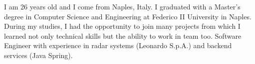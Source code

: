 

\begin{cvparagraph}

I am 26 years old and I come from Naples, Italy. I graduated with a Master's degree in Computer Science and Engineering at Federico II University in Naples. During my studies, I had the opportunity to join many projects from which I learned not only technical skills but the ability to work in team too. Software Engineer with experience in radar systems (Leonardo S.p.A.) and backend services (Java Spring).
\end{cvparagraph}
